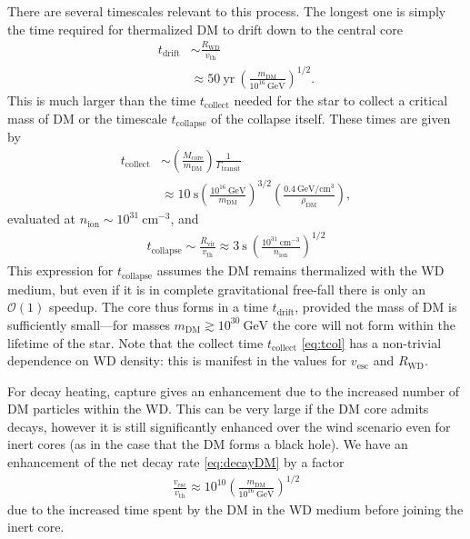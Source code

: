 \documentclass[twocolumn, preprintnumbers,amsmath,amssymb,prd, superscriptaddress]{revtex4}
\newcommand{\GeV}{\text{GeV}}
\newcommand{\cm}{\text{cm}}
\def\r{\right)}
\def\l{\left(}
\begin{document}
There are several timescales relevant to this process.
The longest one is simply the time required for thermalized DM to drift down to the central core
\begin{align}
\label{eq:tdrift}
  t_\text{drift} &\sim \frac{R_\text{WD}}{v_\text{th}} \\
  &\approx 50 ~\text{yr} ~ \l \frac{m_\text{DM}}{10^{16} ~\GeV} \r^{1/2}. \nonumber
\end{align}
This is much larger than the time $t_\text{collect}$ needed for the star to collect a critical mass of DM or the timescale $t_\text{collapse}$ of the collapse itself. These times are given by
\begin{align}
\label{eq:tcol}
  t_\text{collect} &\sim \l \frac{M_\text{core}}{m_\text{DM}}\r \frac{1}{\Gamma_\text{transit}} \\
  & \approx 10 ~\text{s} \l \frac{10^{16} ~\GeV}{m_\text{DM}} \r^{3/2} \l \frac{0.4 ~\GeV/\text{cm}^3}{\rho_\text{DM}} \r,\nonumber
\end{align}
evaluated at $n_\text{ion} \sim 10^{31} ~\cm^{-3}$, and
\begin{align}
  t_\text{collapse} \sim \frac{R_\text{vir}}{v_\text{th}}
  \approx 3 ~\text{s} ~ \l \frac{10^{31} ~\cm^{-3}}{n_\text{ion}}\r^{1/2}
\end{align}
This expression for $t_\text{collapse}$ assumes the DM remains thermalized with the WD medium, but even if it is in complete gravitational free-fall there is only an $\mathcal{O}(1)$ speedup.
The core thus forms in a time $t_\text{drift}$, provided the mass of DM is sufficiently small---for masses $m_\text{DM} \gtrsim 10^{30}~\GeV$ the core will not form within the lifetime of the star.
Note that the collect time $t_\text{collect}$ \eqref{eq:tcol} has a non-trivial dependence on WD density: this is manifest in the values for $v_\text{esc}$ and $R_\text{WD}$.

For decay heating, capture gives an enhancement due to the increased number of DM particles within the WD.
This can be very large if the DM core admits decays, however it is still significantly enhanced over the wind scenario even for inert cores (as in the case that the DM forms a black hole).
We have an enhancement of the net decay rate \eqref{eq:decayDM} by a factor
\begin{align}
\label{eq:enhancedecay}
  \frac{v_\text{esc}}{v_\text{th}}
  \approx 10^{10} \l \frac{m_\text{DM}}{10^{16}~\GeV} \r^{1/2}
\end{align}
due to the increased time spent by the DM in the WD medium before joining the inert core.
\end{document}
